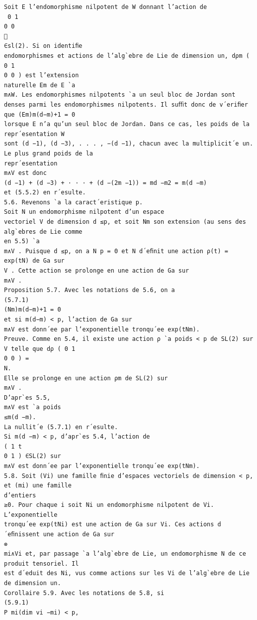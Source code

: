 \documentclass[10pt]{article}
\begin{document}
\begin{verbatim}
Soit E l’endomorphisme nilpotent de W donnant l’action de
  0 1
0 0

∈sl(2). Si on identiﬁe
endomorphismes et actions de l’alg`ebre de Lie de dimension un, dρm ( 0 1
0 0 ) est l’extension
naturelle Em de E `a
m∧W. Les endomorphismes nilpotents `a un seul bloc de Jordan sont
denses parmi les endomorphismes nilpotents. Il suﬃt donc de v´eriﬁer que (Em)m(d−m)+1 = 0
lorsque E n’a qu’un seul bloc de Jordan. Dans ce cas, les poids de la repr´esentation W
sont (d −1), (d −3), . . . , −(d −1), chacun avec la multiplicit´e un. Le plus grand poids de la
repr´esentation
m∧V est donc
(d −1) + (d −3) + · · · + (d −(2m −1)) = md −m2 = m(d −m)
et (5.5.2) en r´esulte.
5.6. Revenons `a la caract´eristique p.
Soit N un endomorphisme nilpotent d’un espace
vectoriel V de dimension d ≤p, et soit Nm son extension (au sens des alg`ebres de Lie comme
en 5.5) `a
m∧V . Puisque d ≤p, on a N p = 0 et N d´eﬁnit une action ρ(t) = exp(tN) de Ga sur
V . Cette action se prolonge en une action de Ga sur
m∧V .
Proposition 5.7. Avec les notations de 5.6, on a
(5.7.1)
(Nm)m(d−m)+1 = 0
et si m(d−m) < p, l’action de Ga sur
m∧V est donn´ee par l’exponentielle tronqu´ee exp(tNm).
Preuve. Comme en 5.4, il existe une action ρ `a poids < p de SL(2) sur V telle que dρ ( 0 1
0 0 ) =
N.
Elle se prolonge en une action ρm de SL(2) sur
m∧V .
D’apr`es 5.5,
m∧V est `a poids
≤m(d −m).
La nullit´e (5.7.1) en r´esulte.
Si m(d −m) < p, d’apr`es 5.4, l’action de
( 1 t
0 1 ) ∈SL(2) sur
m∧V est donn´ee par l’exponentielle tronqu´ee exp(tNm).
5.8. Soit (Vi) une famille ﬁnie d’espaces vectoriels de dimension < p, et (mi) une famille
d’entiers
≥0. Pour chaque i soit Ni un endomorphisme nilpotent de Vi. L’exponentielle
tronqu´ee exp(tNi) est une action de Ga sur Vi. Ces actions d´eﬁnissent une action de Ga sur
⊗
mi∧Vi et, par passage `a l’alg`ebre de Lie, un endomorphisme N de ce produit tensoriel. Il
est d´eduit des Ni, vus comme actions sur les Vi de l’alg`ebre de Lie de dimension un.
Corollaire 5.9. Avec les notations de 5.8, si
(5.9.1)
P mi(dim vi −mi) < p,


\end{verbatim}
\end{document}
